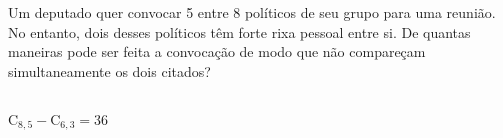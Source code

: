 \begin{ex}
 Um deputado quer convocar 5 entre 8 políticos de seu grupo para uma reunião. No entanto, dois desses políticos têm forte rixa pessoal entre si. De quantas maneiras pode ser feita a convocação de modo que não compareçam simultaneamente os dois citados?
  \begin{sol}
      \phantom{A} \\
  $\text{C}_{8,5}-\text{C}_{6,3}=36$
  \end{sol}
\end{ex}